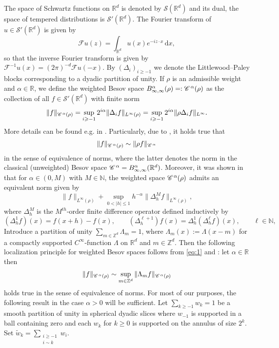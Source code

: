 \documentclass[a4paper,11pt]{article}
\renewcommand{\geq}{\geqslant}
\newcommand{\backassign}{=:}
\numberwithin{equation}{section}
\newcommand{\CC}{\mathscr{C} \hspace{.1em}}
\newcommand{\R}{\mathbb{R}}
\newcommand{\N}{\mathbb{N}}
\newcommand{\8}{\infty}
\newcommand{\dd}{\mathrm{d}}
\begin{document}
The space of Schwartz functions on $\R^{d}$ is denoted by $\mathcal{S}(\R^{d})$ and its dual, the space of tempered distributions is $\mathcal{S}'(\R^{d})$. The Fourier transform of $u\in \mathcal{S}'(\R^{d})$ is given by
$$
\mathcal{F}u(z)=\int_{\R^{d}}u(x)e^{-i z\cdot x}\,\dd x,
$$
so that the inverse Fourier transform is given by $\mathcal{F}^{-1}u(x)=(2\pi)^{-d}\mathcal{F}u(-x).$
 By $(\Delta_{i})_{i\geq -1}$ we denote the Littlewood--Paley blocks corresponding to a dyadic partition of unity.
If $\rho$ is an admissible weight and $\alpha\in\mathbb{R}$, we define the weighted Besov space $B^\alpha_{\infty,\infty}(\rho)\backassign \CC^\alpha(\rho)$ as the collection of all $f\in\mathcal{S}'(\R^{d})$ with finite norm
\[ \| f \|_{\CC^{\alpha} (\rho)} = \sup_{i\geq -1} 2^{i \alpha} \| \Delta_i f
   \|_{L^{\infty} (\rho)} = \sup_{i\geq -1} 2^{i \alpha} \| \rho \Delta_i f
   \|_{L^{\infty}} . \]
More details can be found  e.g. in \cite{T06}. 
Particularly,  due to \cite[Theorem 6.5]{T06}, it holds true that
\begin{equation}\label{eq:1}
   \|f\|_{\CC^\alpha(\rho)}\sim\|\rho f\|_{\CC^\alpha}
\end{equation}
   in the sense of equivalence of norms, where the latter denotes the norm in the classical (unweighted) Besov space $\CC^\alpha=B^\alpha_{\infty,\infty}(\R^{d})$. Moreover, it was shown in \cite[Theorem 6.9]{T06} that for $\alpha\in(0,M)$ with $M\in\N$, the weighted space $\CC^\alpha(\rho)$ admits an equivalent norm given by
\begin{equation}\label{eq:2h}
\|f\|_{L^\infty(\rho)}+\sup_{0<|h|\leqslant 1}h^{-\alpha}\|\Delta^M_h f\|_{L^\infty(\rho)},
\end{equation}
where $\Delta^M_h$ is the $M^{th}$-order finite difference operator  defined inductively by
$$
(\Delta^1_hf)(x)=f(x+h)-f(x),\qquad (\Delta^{\ell+1}_h)f(x)=\Delta^1_h(\Delta^{\ell}_hf)(x),\qquad\ell\in\N,
$$
Introduce a partition of unity  $\sum_{m\in\mathbb{Z}^{d}} \Lambda_m = 1$, where $\Lambda_{m}(x):=\Lambda(x-m)$ for a compactly supported $C^{\8}$-function $\Lambda$ on $\R^{d}$ and $m\in\mathbb{Z}^{d}$. Then the following localization principle for weighted Besov spaces follows from \eqref{eq:1} and \cite[Theorem 2.4.7]{T92}: let $\alpha\in\R$ then
\begin{equation}\label{eq:lem2.1}
   \|f\|_{\CC^\alpha(\rho)}\sim\sup_{m\in\mathbb{Z}^{d}}\|\Lambda_{m} f\|_{\CC^\alpha(\rho)}
\end{equation}
holds true in the sense of equivalence of norms. For most of our purposes, the following result in the case $\alpha>0$ will be sufficient. Let  $\sum_{k\geq-1} w_k = 1$ be a smooth partition of unity in spherical dyadic slices
where $w_{-1}$ is supported in a ball containing zero and each $w_k$ for $k\geq0$ is supported on the annulus of size $2^k$. Set
$\tilde{w}_k = \sum_{\substack{i\geq-1\\i \sim k}} w_i$.
\end{document}
